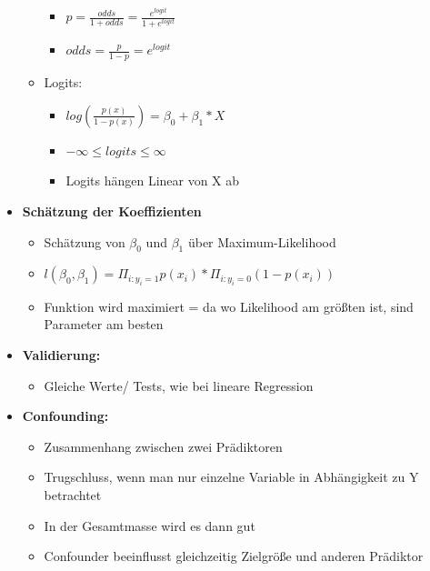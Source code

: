 \documentclass[a4paper]{article}
\begin{document}
\begin{landscape}
\begin{multicols}{3}
\begin{itemize}[noitemsep,nolistsep,leftmargin=*]
\begin{itemize}[noitemsep,nolistsep,leftmargin=*]
\begin{itemize}[noitemsep,nolistsep,leftmargin=*]
                    \item $p = \frac{odds}{1+odds} = \frac{e^{logit}}{1+e^{logit}}$
                    \item $odds = \frac{p}{1-p} = e^{logit}$
                \end{itemize}
                \item Logits:
                \begin{itemize}[noitemsep,nolistsep,leftmargin=*]
                    \item $log(\frac{p(x)}{1-p(x)})= \beta_0+\beta_1*X$
                    \item $-\infty \leq logits \leq \infty$
                    \item Logits hängen Linear von X ab
                \end{itemize}
            \end{itemize}
            \item \textbf{Schätzung der Koeffizienten}
            \begin{itemize}[noitemsep,nolistsep,leftmargin=*]
                \item Schätzung von $\beta_0$ und $\beta_1$ über Maximum-Likelihood
                \item $l(\beta_0, \beta_1)= \Pi_{i:y_i=1} p(x_i) * \Pi_{i:y_i=0} (1-p(x_i)) $
                \item Funktion wird maximiert = da wo Likelihood am größten ist, sind Parameter am besten
            \end{itemize}
            \item \textbf{Validierung:}
            \begin{itemize}[noitemsep,nolistsep,leftmargin=*]
                \item Gleiche Werte/ Tests, wie bei lineare Regression
            \end{itemize}
            \item \textbf{Confounding:}
            \begin{itemize}[noitemsep,nolistsep,leftmargin=*]
                \item Zusammenhang zwischen zwei Prädiktoren
                \item Trugschluss, wenn man nur einzelne Variable in Abhängigkeit zu Y betrachtet
                \item In der Gesamtmasse wird es dann gut
                \item Confounder beeinflusst gleichzeitig Zielgröße und anderen Prädiktor
            \end{itemize}
        \end{itemize}



\end{multicols}
\end{landscape}
\end{document}
